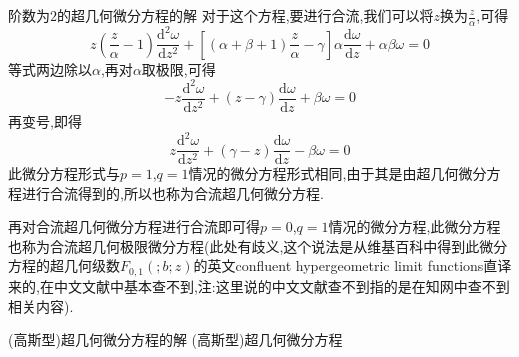 \documentclass[zihao=-4,a4paper]{ctexart}
\begin{document}
\begin{mproof}{阶数为$2$的超几何微分方程的解}
	对于这个方程,要进行合流,我们可以将${z}$换为$\frac{z}{\alpha}$,可得
	\begin{equation*}
		{z} \left( \frac{z}{\alpha} - 1 \right) \frac{ { \text{d} }^{2} {\omega} }{ \text{d} {z}^{2} } + \left[ \left( {\alpha} + {\beta} + 1 \right) \frac{z}{\alpha} - {\gamma} \right] {\alpha} \frac{ \text{d} {\omega} }{ \text{d} {z} } + {\alpha} {\beta} {\omega} = 0
	\end{equation*}
	等式两边除以$\alpha$,再对${\alpha}$取极限,可得
	\begin{equation*}
		- {z} \frac{ { \text{d} }^{2} {\omega} }{ \text{d} {z}^{2} } + \left( {z} - {\gamma} \right) \frac{ \text{d} {\omega} }{ \text{d} {z} } + {\beta} {\omega} = 0
	\end{equation*}
	再变号,即得
	\begin{equation*}
		{z} \frac{ { \text{d} }^{2} {\omega} }{ \text{d} {z}^{2} } + \left( {\gamma} - {z} \right) \frac{ \text{d} {\omega} }{ \text{d} {z} } - {\beta} {\omega} = 0
	\end{equation*}
	此微分方程形式与$p=1$,$q=1$情况的微分方程形式相同,由于其是由超几何微分方程进行合流得到的,所以也称为合流超几何微分方程.

	再对合流超几何微分方程进行合流即可得$p=0$,$q=1$情况的微分方程,此微分方程也称为合流超几何极限微分方程(此处有歧义,这个说法是从维基百科中得到此微分方程的超几何级数$ {F}_{ {0} , {1} } \left( ; {b} ; {z} \right)$的英文confluent hypergeometric limit functions直译来的,在中文文献中基本查不到,注:这里说的中文文献查不到指的是在知网中查不到相关内容).
\end{mproof}

\begin{mproof}{(高斯型)超几何微分方程的解}
	(高斯型)超几何微分方程
\end{mproof}


\begin{mtheorem}{}
\end{mtheorem}

\end{document}
